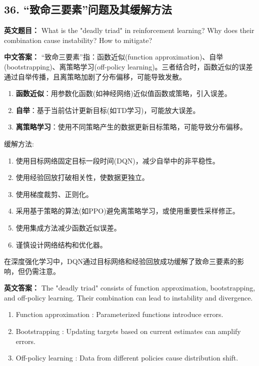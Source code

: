 \documentclass[10pt,a4paper]{ctexart}
\begin{document}
\subsection*{36. “致命三要素”问题及其缓解方法}
\textbf{英文题目：} What is the "deadly triad" in reinforcement learning? Why does their combination cause instability? How to mitigate?

\textbf{中文答案：}  
“致命三要素”指：函数近似(function approximation)、自举(bootstrapping)、离策略学习(off-policy learning)。三者结合时，函数近似的误差通过自举传播，且离策略加剧了分布偏移，可能导致发散。

\begin{enumerate}
    \item \textbf{函数近似}：用参数化函数(如神经网络)近似值函数或策略，引入误差。
    \item \textbf{自举}：基于当前估计更新目标(如TD学习)，可能放大误差。
    \item \textbf{离策略学习}：使用不同策略产生的数据更新目标策略，可能导致分布偏移。
\end{enumerate}

 缓解方法:
\begin{enumerate}
    \item 使用目标网络固定目标一段时间(DQN)，减少自举中的非平稳性。
    \item 使用经验回放打破相关性，使数据更独立。
    \item 使用梯度裁剪、正则化。
    \item 采用基于策略的算法(如PPO)避免离策略学习，或使用重要性采样修正。
    \item 使用集成方法减少函数近似误差。
    \item 谨慎设计网络结构和优化器。
\end{enumerate}

在深度强化学习中，DQN通过目标网络和经验回放成功缓解了致命三要素的影响，但仍需注意。

\textbf{英文答案：}  
The "deadly triad" consists of function approximation, bootstrapping, and off-policy learning. Their combination can lead to instability and divergence.

\begin{enumerate}
    \item Function approximation : Parameterized functions introduce errors.
    \item Bootstrapping : Updating targets based on current estimates can amplify errors.
    \item Off-policy learning : Data from different policies cause distribution shift.
\end{enumerate}
\end{document}
